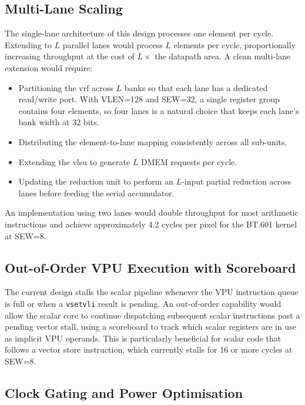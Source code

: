 \subsection{Multi-Lane Scaling}

The single-lane architecture of this design processes one element per cycle. Extending
to $L$ parallel lanes would process $L$ elements per cycle, proportionally increasing
throughput at the cost of $L\times$ the datapath area. A clean multi-lane extension
would require:

\begin{itemize}
  \item Partitioning the \gls{vrf} across $L$ banks so that each lane has a dedicated
        read/write port. With VLEN=128 and SEW=32, a single register group contains
        four elements, so four lanes is a natural choice that keeps each lane's bank
        width at 32 bits.
  \item Distributing the element-to-lane mapping consistently across all sub-units.
  \item Extending the \gls{vlsu} to generate $L$ DMEM requests per cycle.
  \item Updating the reduction unit to perform an $L$-input partial reduction across
        lanes before feeding the serial accumulator.
\end{itemize}

An implementation using two lanes would double throughput for most arithmetic
instructions and achieve approximately 4.2 cycles per pixel for the BT.601 kernel at
SEW=8.

\subsection{Out-of-Order VPU Execution with Scoreboard}

The current design stalls the scalar pipeline whenever the VPU instruction queue is
full or when a \texttt{vsetvli} result is pending. An out-of-order capability would
allow the scalar core to continue dispatching subsequent scalar instructions past a
pending vector stall, using a scoreboard to track which scalar registers are in use
as implicit VPU operands. This is particularly beneficial for scalar code that follows
a vector store instruction, which currently stalls for 16 or more cycles at SEW=8.

\subsection{Clock Gating and Power Optimisation}

